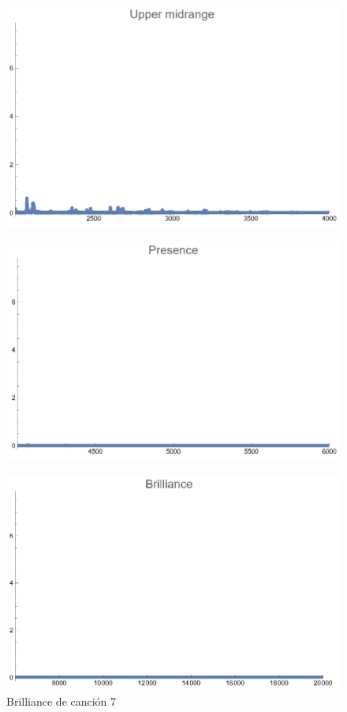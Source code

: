 \documentclass[12pt, letterpaper]{article}
\begin{document}
\begin{figure}[H]
  \centering
  \begin{minipage}{.5\textwidth}
    \centering
    \includegraphics[width=.9\linewidth]{imgs/Cancion7/upmid.png}
    \label{fig:07f}
  \end{minipage}%
  \begin{minipage}{.5\textwidth}
    \centering
    \includegraphics[width=.9\linewidth]{imgs/Cancion7/presence.png}
    \label{fig:07g}
  \end{minipage}
\end{figure}
\begin{figure}[H]
  \centering
  \includegraphics[width=.45\linewidth]{imgs/Cancion7/brilliance.png}
  \caption{Brilliance de canción 7}
  \label{fig:07h}
\end{figure}
\end{document}
